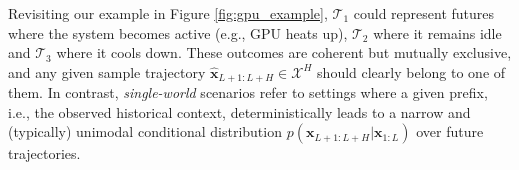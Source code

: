 \documentclass[a4paper,oneside,bibliography=totoc]{scrbook}
\begin{document}
\noindent
Revisiting our example in Figure \ref{fig:gpu_example}, $\mathcal{T}_1$ could represent futures where the system becomes active (e.g., GPU heats up), $\mathcal{T}_2$ where it remains idle and $\mathcal{T}_3$ where it cools down. These outcomes are coherent but mutually exclusive, and any given sample trajectory $\hat{\mathbf{x}}_{L+1:L+H} \in \mathcal{X}^H$ should clearly belong to one of them.
In contrast, \textit{single-world} scenarios refer to settings where a given prefix, i.e., the observed historical context, deterministically leads to a narrow and (typically) unimodal conditional distribution $p(\mathbf{x}_{L+1:L+H}|\mathbf{x}_{1:L})$ over future trajectories. 
\end{document}
